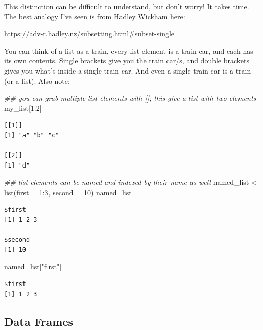 \documentclass[
  letterpaper,
  DIV=11,
  numbers=noendperiod]{scrreprt}
\newenvironment{Shaded}{\begin{snugshade}}{\end{snugshade}}
\newcommand{\AttributeTok}[1]{\textcolor[rgb]{0.40,0.45,0.13}{#1}}
\newcommand{\DecValTok}[1]{\textcolor[rgb]{0.68,0.00,0.00}{#1}}
\newcommand{\DocumentationTok}[1]{\textcolor[rgb]{0.37,0.37,0.37}{\textit{#1}}}
\newcommand{\FunctionTok}[1]{\textcolor[rgb]{0.28,0.35,0.67}{#1}}
\newcommand{\NormalTok}[1]{\textcolor[rgb]{0.00,0.23,0.31}{#1}}
\newcommand{\OtherTok}[1]{\textcolor[rgb]{0.00,0.23,0.31}{#1}}
\newcommand{\SpecialCharTok}[1]{\textcolor[rgb]{0.37,0.37,0.37}{#1}}
\newcommand{\StringTok}[1]{\textcolor[rgb]{0.13,0.47,0.30}{#1}}
\begin{document}
This distinction can be difficult to understand, but don't worry! It
takes time. The best analogy I've seen is from Hadley Wickham here:

\url{https://adv-r.hadley.nz/subsetting.html\#subset-single}

You can think of a list as a train, every list element is a train car,
and each has its own contents. Single brackets give you the train car/s,
and double brackets gives you what's inside a single train car. And even
a single train car is a train (or a list). Also note:

\begin{Shaded}
\begin{Highlighting}[]
\DocumentationTok{\#\# you can grab multiple list elements with []; this give a list with two elements}
\NormalTok{my\_list[}\DecValTok{1}\SpecialCharTok{:}\DecValTok{2}\NormalTok{]}
\end{Highlighting}
\end{Shaded}

\begin{verbatim}
[[1]]
[1] "a" "b" "c"

[[2]]
[1] "d"
\end{verbatim}

\begin{Shaded}
\begin{Highlighting}[]
\DocumentationTok{\#\# list elements can be named and indexed by their name as well}
\NormalTok{named\_list }\OtherTok{\textless{}{-}} \FunctionTok{list}\NormalTok{(}\AttributeTok{first =} \DecValTok{1}\SpecialCharTok{:}\DecValTok{3}\NormalTok{, }\AttributeTok{second =} \DecValTok{10}\NormalTok{)}
\NormalTok{named\_list}
\end{Highlighting}
\end{Shaded}

\begin{verbatim}
$first
[1] 1 2 3

$second
[1] 10
\end{verbatim}

\begin{Shaded}
\begin{Highlighting}[]
\NormalTok{named\_list[}\StringTok{"first"}\NormalTok{]}
\end{Highlighting}
\end{Shaded}

\begin{verbatim}
$first
[1] 1 2 3
\end{verbatim}

\hypertarget{sec-sub_data}{%
\subsection{Data Frames}\label{sec-sub_data}}
\end{document}
